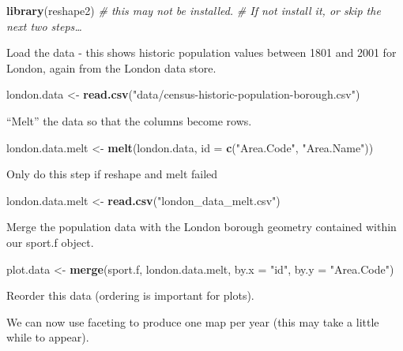 \documentclass[]{article}
\newenvironment{Shaded}{}{}
\newcommand{\KeywordTok}[1]{\textcolor[rgb]{0.00,0.44,0.13}{\textbf{{#1}}}}
\newcommand{\DataTypeTok}[1]{\textcolor[rgb]{0.56,0.13,0.00}{{#1}}}
\newcommand{\StringTok}[1]{\textcolor[rgb]{0.25,0.44,0.63}{{#1}}}
\newcommand{\CommentTok}[1]{\textcolor[rgb]{0.38,0.63,0.69}{\textit{{#1}}}}
\newcommand{\NormalTok}[1]{{#1}}
\begin{document}
\begin{Shaded}
\begin{Highlighting}[]
\KeywordTok{library}\NormalTok{(reshape2)  }\CommentTok{# this may not be installed. }
\CommentTok{# If not install it, or skip the next two steps…}
\end{Highlighting}
\end{Shaded}
Load the data - this shows historic population values between 1801 and
2001 for London, again from the London data store.

\begin{Shaded}
\begin{Highlighting}[]
\NormalTok{london.data <- }\KeywordTok{read.csv}\NormalTok{(}\StringTok{"data/census-historic-population-borough.csv"}\NormalTok{)}
\end{Highlighting}
\end{Shaded}
``Melt'' the data so that the columns become rows.

\begin{Shaded}
\begin{Highlighting}[]
\NormalTok{london.data.melt <- }\KeywordTok{melt}\NormalTok{(london.data, }\DataTypeTok{id =} \KeywordTok{c}\NormalTok{(}\StringTok{"Area.Code"}\NormalTok{, }\StringTok{"Area.Name"}\NormalTok{))}
\end{Highlighting}
\end{Shaded}
Only do this step if reshape and melt failed

\begin{Shaded}
\begin{Highlighting}[]
\NormalTok{london.data.melt <- }\KeywordTok{read.csv}\NormalTok{(}\StringTok{"london_data_melt.csv"}\NormalTok{)}
\end{Highlighting}
\end{Shaded}
Merge the population data with the London borough geometry contained
within our sport.f object.

\begin{Shaded}
\begin{Highlighting}[]
\NormalTok{plot.data <- }\KeywordTok{merge}\NormalTok{(sport.f, london.data.melt, }\DataTypeTok{by.x =} \StringTok{"id"}\NormalTok{, }\DataTypeTok{by.y =} \StringTok{"Area.Code"}\NormalTok{)}
\end{Highlighting}
\end{Shaded}
Reorder this data (ordering is important for plots).

\begin{Shaded}
\end{Shaded}
We can now use faceting to produce one map per year (this may take a
little while to appear).
\end{document}
